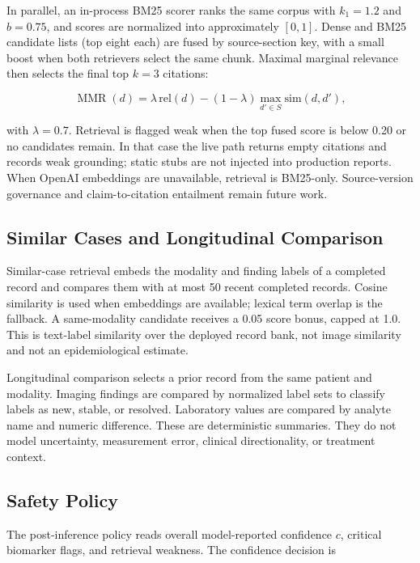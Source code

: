 \documentclass[conference]{IEEEtran}
\begin{document}
In parallel, an in-process BM25 scorer ranks the same corpus with \(k_1=1.2\) and \(b=0.75\), and scores are normalized into approximately \([0,1]\). Dense and BM25 candidate lists (top eight each) are fused by source-section key, with a small boost when both retrievers select the same chunk. Maximal marginal relevance then selects the final top \(k=3\) citations:

\begin{equation}
\operatorname{MMR}(d)=
\lambda\,\mathrm{rel}(d)-(1-\lambda)\max_{d'\in S}\mathrm{sim}(d,d'),
\end{equation}

with \(\lambda=0.7\). Retrieval is flagged weak when the top fused score is below 0.20 or no candidates remain. In that case the live path returns empty citations and records weak grounding; static stubs are not injected into production reports. When OpenAI embeddings are unavailable, retrieval is BM25-only. Source-version governance and claim-to-citation entailment remain future work.

\subsection{Similar Cases and Longitudinal Comparison}

Similar-case retrieval embeds the modality and finding labels of a completed record and compares them with at most 50 recent completed records. Cosine similarity is used when embeddings are available; lexical term overlap is the fallback. A same-modality candidate receives a 0.05 score bonus, capped at 1.0. This is text-label similarity over the deployed record bank, not image similarity and not an epidemiological estimate.

Longitudinal comparison selects a prior record from the same patient and modality. Imaging findings are compared by normalized label sets to classify labels as new, stable, or resolved. Laboratory values are compared by analyte name and numeric difference. These are deterministic summaries. They do not model uncertainty, measurement error, clinical directionality, or treatment context.

\subsection{Safety Policy}

The post-inference policy reads overall model-reported confidence \(c\), critical biomarker flags, and retrieval weakness. The confidence decision is
\end{document}
